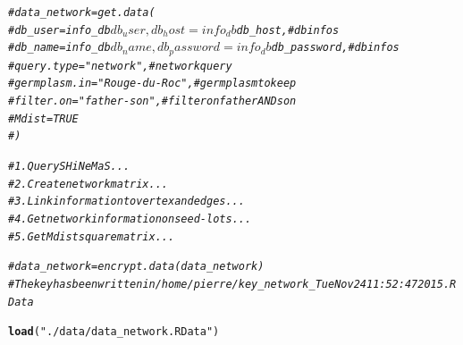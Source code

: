 \documentclass{article}\usepackage[]{graphicx}\usepackage[]{color}
\makeatletter
\newcommand{\hlstr}[1]{\textcolor[rgb]{0.192,0.494,0.8}{#1}}%
\newcommand{\hlcom}[1]{\textcolor[rgb]{0.678,0.584,0.686}{\textit{#1}}}%
\newcommand{\hlstd}[1]{\textcolor[rgb]{0.345,0.345,0.345}{#1}}%
\newcommand{\hlkwd}[1]{\textcolor[rgb]{0.737,0.353,0.396}{\textbf{#1}}}%
\newenvironment{kframe}{%
 \def\at@end@of@kframe{}%
 \ifinner\ifhmode%
  \def\at@end@of@kframe{\end{minipage}}%
  \begin{minipage}{\columnwidth}%
 \fi\fi%
 \def\FrameCommand##1{\hskip\@totalleftmargin \hskip-\fboxsep
 \colorbox{shadecolor}{##1}\hskip-\fboxsep
     \hskip-\linewidth \hskip-\@totalleftmargin \hskip\columnwidth}%
 \MakeFramed {\advance\hsize-\width
   \@totalleftmargin\z@ \linewidth\hsize
   \@setminipage}}%
 {\par\unskip\endMakeFramed%
 \at@end@of@kframe}
\newenvironment{knitrout}{}{} %
\makeatother
\begin{document}
\begin{knitrout}
\color{fgcolor}\begin{kframe}
\begin{alltt}
\hlcom{#data_network = get.data(}
\hlcom{#	db_user = info_db$db_user, db_host = info_db$db_host, # db infos}
\hlcom{#	db_name = info_db$db_name, db_password = info_db$db_password, # db infos}
\hlcom{#	query.type = "network", # network query}
\hlcom{#	germplasm.in = "Rouge-du-Roc", # germplasm to keep}
\hlcom{#	filter.on = "father-son", # filter on father AND son}
\hlcom{#	Mdist = TRUE}
\hlcom{#	)}

\hlcom{# 1. Query SHiNeMaS ...}
\hlcom{# 2. Create network matrix ...}
\hlcom{# 3. Link information to vertex and edges ...}
\hlcom{# 4. Get network information on seed-lots ...}
\hlcom{# 5. Get Mdist square matrix ...}

\hlcom{#data_network = encrypt.data(data_network)}
\hlcom{#The key has been written in /home/pierre/key_network_Tue Nov 24 11:52:47 2015.RData}

\hlkwd{load}\hlstd{(}\hlstr{"./data/data_network.RData"}\hlstd{)}
\end{alltt}
\end{kframe}
\end{knitrout}
\end{document}
